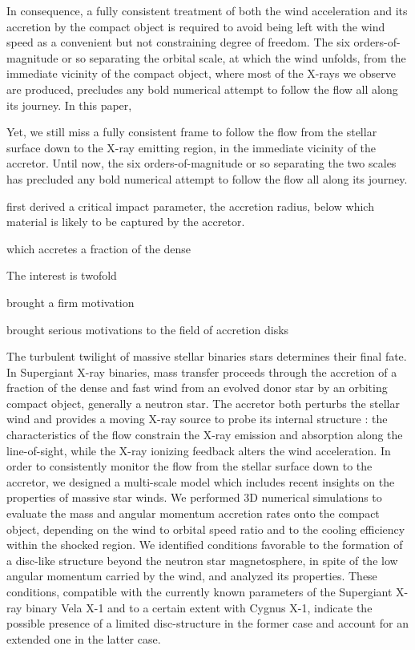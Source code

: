 \documentclass{aa}
\begin{document}
In consequence, a fully consistent treatment of both the wind acceleration and its accretion by the compact object is required to avoid being left with the wind speed as a convenient but not constraining degree of freedom. The six orders-of-magnitude or so separating the orbital scale, at which the wind unfolds, from the immediate vicinity of the compact object, where most of the X-rays we observe are produced, precludes any bold numerical attempt to follow the flow all along its journey. In this paper, 




Yet, we still miss a fully consistent frame to follow the flow from the stellar surface down to the X-ray emitting region, in the immediate vicinity of the accretor. Until now, the six orders-of-magnitude or so separating the two scales has precluded any bold numerical attempt to follow the flow all along its journey.


\cite{Hoyle:1939fl} first derived a critical impact parameter, the accretion radius, below which material is likely to be captured by the accretor.

which accretes a fraction of the dense

The interest is twofold \citep{Martinez-Nunez2017}

brought a firm motivation

brought serious motivations to the field of accretion disks


The turbulent twilight of massive stellar binaries stars determines their final fate. In Supergiant X-ray binaries, mass transfer proceeds through the accretion of a fraction of the dense and fast wind from an evolved donor star by an orbiting compact object, generally a neutron star. The accretor both perturbs the stellar wind and provides a moving X-ray source to probe its internal structure : the characteristics of the flow constrain the X-ray emission and absorption along the line-of-sight, while the X-ray ionizing feedback alters the wind acceleration. In order to consistently monitor the flow from the stellar surface down to the accretor, we designed a multi-scale model which includes recent insights on the properties of massive star winds. We performed 3D numerical simulations to evaluate the mass and angular momentum accretion rates onto the compact object, depending on the wind to orbital speed ratio and to the cooling efficiency within the shocked region. We identified conditions favorable to the formation of a disc-like structure beyond the neutron star magnetosphere, in spite of the low angular momentum carried by the wind, and analyzed its properties. These conditions, compatible with the currently known parameters of the Supergiant X-ray binary Vela X-1 and to a certain extent with Cygnus X-1, indicate the possible presence of a limited disc-structure in the former case and account for an extended one in the latter case.
\end{document}
